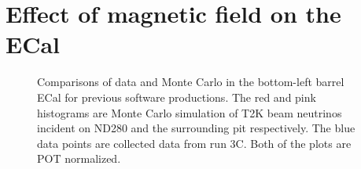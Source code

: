 \section{Effect of magnetic field on the ECal}
\label{sec:MagneticFieldEffect}
\begin{figure}%
  \centering

  \caption{Comparisons of data and Monte Carlo in the bottom-left barrel ECal for previous software productions.  The red and pink histograms are Monte Carlo simulation of T2K beam neutrinos incident on ND280 and the surrounding pit respectively.  The blue data points are collected data from run 3C.  Both of the plots are POT normalized.}
  \label{fig:BLBNoField}
\end{figure}
